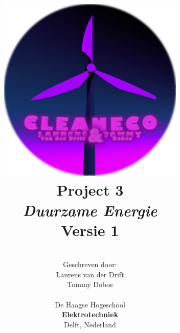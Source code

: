 \title{
\includegraphics[width=3.5in]{IMG/logo/finalcircle.png} \\
\vspace*{1in}
\textbf{Project 3}\\
\textit{Duurzame Energie}\\
Versie 1
}
\author{
\vspace*{1in} \\
  Geschreven door:\\
  Laurens van der Drift\\
  Tommy Dobos\\
		\vspace*{0.2in} \\
		De Haagse Hogeschool\\
        \textbf{Elektrotechniek}\\
        Delft, Nederland
       } 